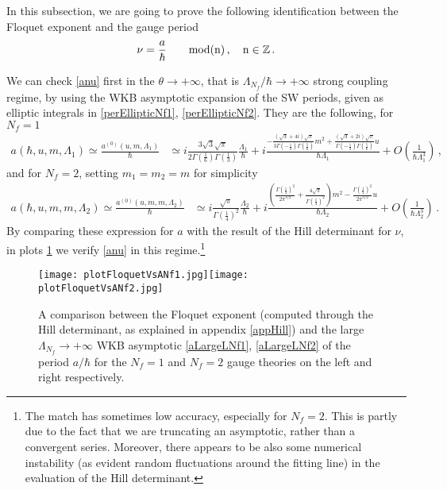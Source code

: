 \documentclass[11pt,a4paper]{elsarticle}
\def \ba {\begin{aligned}}
\def \ea {\end{aligned}}
\newcommand{\be}{\begin{equation}}
\newcommand{\ee}{\end{equation}}
\numberwithin{figure}{section}
\numberwithin{table}{section}
\begin{document}
In this subsection, we are going to prove the following identification between the Floquet exponent and the gauge period
\be \label{anu}
\nu =  \frac{a}{\hbar}\qquad \rm{mod}( n)\,,\quad n \in \mathbb{Z}\,.
\ee

We can check \eqref{anu} first in the $\theta \to + \infty$, that is $\Lambda_{N_f}/\hbar \to + \infty$ strong coupling regime, by using the WKB asymptotic expansion of the SW periods, given as elliptic integrals in \eqref{perEllipticNf1}, \eqref{perEllipticNf2}. They are the following, 
for $N_f=1$
\be
\ba \label{aLargeLNf1}
a(\hbar,u,m,\Lambda_1) \simeq \frac{a^{(0)}(u,m,\Lambda_1)}{\hbar}&\simeq i\frac{3 \sqrt{3} \sqrt{\pi } }{2 \Gamma \left(\frac{1}{6}\right) \Gamma \left(\frac{1}{3}\right)}\frac{\Lambda_1}{\hbar}+i\frac{-\frac{\left(\sqrt{3}+4 i\right) \sqrt{\pi }}{3 \Gamma \left(-\frac{1}{3}\right) \Gamma \left(\frac{5}{6}\right)}m^2+\frac{ \left(\sqrt{3}+2 i\right) \sqrt{\pi }}{\Gamma \left(-\frac{1}{3}\right) \Gamma \left(\frac{5}{6}\right)}u}{\hbar \Lambda_1}+O\left( \frac{1}{\hbar \Lambda_1^3}\right)\,,
\ea
\ee
and for $N_f=2$, setting $m_1=m_2=m$ for simplicity
\be
\ba
a(\hbar,u,m,m,\Lambda_2) \simeq \frac{a^{(0)}(u,m,m,\Lambda_2)}{\hbar}&\simeq i\frac{ \sqrt{\pi } }{\Gamma \left(\frac{1}{4}\right)^2}\frac{\Lambda _2}{\hbar}+i\frac{ \left(\frac{ \Gamma \left(\frac{1}{4}\right)^2}{2\pi ^{3/2}}+\frac{4\sqrt{\pi }}{\Gamma \left(\frac{1}{4}\right)^2}\right)m^2-\frac{  \Gamma \left(\frac{1}{4}\right)^2}{2\pi ^{3/2}}u}{\hbar \Lambda _2}+O\left( \frac{1}{\hbar \Lambda_2^3}\right)\,.
\ea\label{aLargeLNf2}
\ee
By comparing these expression for $a$ with the result of the Hill determinant for $\nu$, in plots \ref{fig:anu2} we verify \eqref{anu} in this regime.\footnote{The match has sometimes low accuracy, especially for $N_f=2$. This is partly due to the fact that we are truncating an asymptotic, rather than a convergent series. Moreover, there appears to be also some numerical instability (as evident random fluctuations around the fitting line) in the evaluation of the Hill determinant.} 

\begin{figure}
\centering
\texttt{[image: plotFloquetVsANf1.jpg]}\texttt{[image: plotFloquetVsANf2.jpg]}
\caption{A comparison between the Floquet exponent (computed through the Hill determinant, as explained in appendix \ref{appHill}) and the large $\Lambda_{N_f} \to + \infty$ WKB asymptotic \eqref{aLargeLNf1}, \eqref{aLargeLNf2} of the period $a/\hbar$ for the $N_f=1$ and $N_f=2$ gauge theories on the left and right respectively.}
\label{fig:anu2}
\end{figure}
\end{document}
